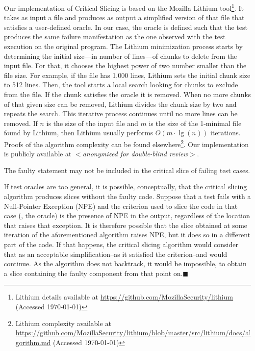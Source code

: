 \documentclass{article}
\begin{document}
Our implementation of Critical Slicing is based on the Mozilla Lithium
tool\footnote{Lithium details available at {\footnotesize\url{https://github.com/MozillaSecurity/lithium}} (Accessed \today)}. It takes as input a file
and produces as output a simplified version of that file that
satisfies a user-defined oracle. In our case, the oracle is defined
such that the test produces the same failure manifestation as the one
observed with the test execution on the original program. The
Lithium minimization process starts by determining the initial size---in
number of lines---of chunks to delete from the input file. For that,
it chooses the highest power of two number smaller than the file
size. For example, if the file has 1,000 lines, Lithium sets the
initial chunk size to 512 lines. Then, the tool starts a local search looking
for chunks to exclude from the file. If the chunk satisfies the oracle it is removed.
When no more chunks of that given size can be removed, Lithium
divides the chunk size by two and repeats the search. This iterative
process continues until no more lines can be removed.  If $n$ is the
size of the input file and $m$ is the size of the 1-minimal file found
by Lithium, then Lithium usually performs $O(m\cdot\lg(n))$
iterations. Proofs of the algorithm complexity can be found
elsewhere\footnote{Lithium complexity available at \url{https://github.com/MozillaSecurity/lithium/blob/master/src/lithium/docs/algorithm.md} (Accessed \today)}. Our implementation is publicly
available at \textit{$<$anonymized for double-blind review$>$}.

\begin{theorem}\label{the:1}
  The faulty statement may not be included in the critical slice of
  failing test cases.
\end{theorem}


If test oracles are too general, it is possible, conceptually, that
the critical slicing algorithm produces slices without the faulty
code. Suppose that a test fails with a Null-Pointer Exception (NPE)
and the criterion used to slice the code in that case (\ie{}, the
oracle) is the presence of NPE in the output, regardless of the
location that raises that exception. It is therefore possible that the
slice obtained at some iteration of the aforementioned algorithm
raises NPE, but it does so in a different part of the code. If that
happens, the critical slicing algorithm would consider that as an
acceptable simplification--as it satisfied the criterion--and would
continue. As the algorithm does not backtrack, it would be impossible,
to obtain a slice containing the faulty component from that point
on.\hfill{\tiny$\blacksquare$}
\end{document}
